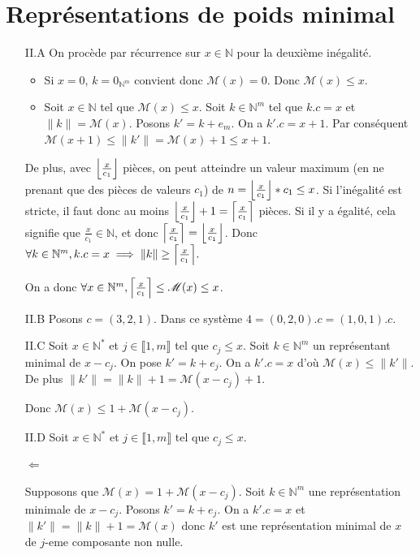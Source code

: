 \documentclass{article}
\newcommand{\N}{\mathbb{N}}
\newcommand{\M}{\mathscr{M}}
\newcommand{\norm}[1]{\|#1\|}
\newcommand{\scal}{.}
\newcommand{\seg}[2]{\llbracket #1, #2 \rrbracket}
\DeclarePairedDelimiter{\ceil}{\lceil}{\rceil}
\DeclarePairedDelimiter{\floor}{\lfloor}{\rfloor}
\begin{document}
\section{Représentations de poids minimal}
\begin{enumerate}
    \item[II.A] On procède par récurrence sur $x\in\N$ pour la deuxième inégalité.
        \begin{itemize}
            \item Si $x=0$, $k = 0_{\N^m}$ convient donc $\M(x) = 0$. Donc $\M(x) \leq x$.
            \item Soit $x\in\N$ tel que $\M(x)\leq x$. Soit $k\in\N^m$ tel que $k\scal c = x$ et $\norm{k} = \M(x)$. Posons $k' = k + e_m$. On a $k'\scal c = x+1$. Par conséquent $\M(x+1)\leq \norm{k'} = \M(x) + 1 \leq x+1$.
        \end{itemize}

        De plus, avec $\floor*{\frac{x}{c_1}}$ pièces, on peut atteindre un valeur maximum (en ne prenant que des pièces de valeurs $c_1$) de $n = \floor*{\frac{x}{c_1}} * c_1 \leq x$. Si l'inégalité est stricte, il faut donc au moins $\floor*{\frac{x}{c_1}} + 1 = \ceil*{\frac{x}{c_1}}$ pièces. Si il y a égalité, cela signifie que $\frac{x}{c_1} \in\N$, et donc $\ceil*{\frac{x}{c_1}} = \floor*{\frac{x}{c_1}}$. Donc $\forall k\in\N^m, k.c = x \implies \norm{k} \geq \ceil*{\frac{x}{c_1}}.$

        On a donc $\forall x \in\N^m, \ceil*{\frac{x}{c_1}} \leq \M(x) \leq x$.

    \item[II.B] Posons $c = (3,2,1)$. Dans ce système $4 = (0,2,0)\scal c = (1,0,1)\scal c$.

    \item[II.C] Soit $x\in\N^*$ et $j\in\seg{1}{m}$ tel que $c_j\leq x$. Soit $k\in\N^m$ un représentant minimal de $x-c_j$. On pose $k' = k + e_j$. On a $k'\scal c = x$ d'où $\M(x) \leq \norm{k'}$. De plus $\norm{k'} = \norm{k} + 1 = \M(x-c_j) + 1$.

        Donc $\M(x) \leq 1 + \M(x-c_j)$.

    \item[II.D] Soit $x\in\N^*$ et $j\in\seg{1}{m}$ tel que $c_j\leq x$.
        \paragraph{$\Leftarrow$} Supposons que $\M(x) = 1 + \M(x-c_j)$. Soit $k\in\N^m$ une représentation minimale de $x-c_j$. Posons $k' = k + e_j$. On a $k'\scal c = x$ et $\norm{k'} = \norm{k} + 1 = \M(x)$ donc $k'$ est une représentation minimal de $x$ de $j$-eme composante non nulle.

\end{enumerate}
\end{document}
